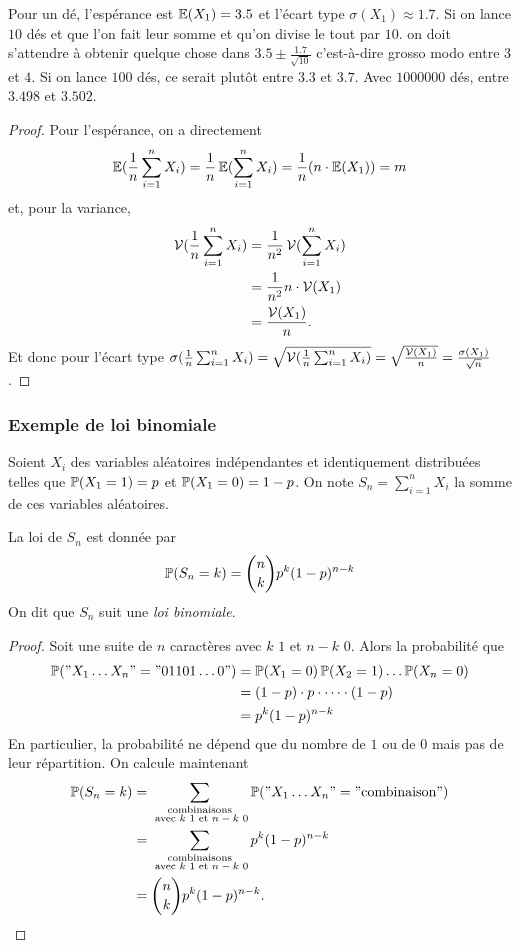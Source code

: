 \begin{ex}
Pour un dé, l'espérance est $\operatorname{\mathbb E}(X_1) = 3.5$ et l'écart type $\sigma(X_1)\approx 1.7$. Si on lance $10$ dés et que l'on fait leur somme et qu'on divise le tout par $10$. on doit s'attendre à obtenir quelque chose dans $3.5\pm\frac{1.7}{\sqrt{10}}$ c'est-à-dire grosso modo entre $3$ et $4$. Si on lance $100$ dés, ce serait plutôt entre $3.3$ et $3.7$. Avec $1000000$ dés, entre $3.498$ et $3.502$.
\end{ex}

\begin{proof}
Pour l'espérance, on a directement
$$\operatorname{\mathbb E}(\frac1n\sum_{i = 1}^nX_i) = \frac1n\operatorname{\mathbb E}(\sum_{i = 1}^nX_i) = \frac1n(n \cdot \operatorname{\mathbb E}(X_1)) = m$$
et, pour la variance,
\begin{align*}
\operatorname{\mathcal V}(\frac1n\sum_{i = 1}^nX_i) & = \frac1{n^2}\operatorname{\mathcal V}(\sum_{i = 1}^nX_i) \\
& = \frac1{n^2}n \cdot \operatorname{\mathcal V}(X_1) \\
& = \frac{\operatorname{\mathcal V}(X_1)}n.
\end{align*}
Et donc pour l'écart type $\sigma(\frac1n\sum_{i = 1}^nX_i) = \sqrt{\operatorname{\mathcal V}(\frac1n\sum_{i = 1}^nX_i)} = \sqrt{\frac{\operatorname{\mathcal V}(X_1)}n} = \frac{\sigma(X_1)}{\sqrt n}$.
\end{proof}


\subsubsection{Exemple de loi binomiale}


Soient $X_i$ des variables aléatoires indépendantes et identiquement distribuées telles que $\operatorname{\mathbb P}(X_1 = 1) = p$ et $\operatorname{\mathbb P}(X_1 = 0) = 1 - p$. On note $S_n = \sum_{i = 1}^nX_i$ la somme de ces variables aléatoires.


\begin{pro}
La loi de $S_n$ est donnée par
$$\operatorname{\mathbb P}(S_n = k) = \binom n k p^k(1 - p)^{n - k}$$
On dit que $S_n$ suit une \textit{loi binomiale}.
\end{pro}

\begin{proof}
Soit une suite de $n$ caractères avec $k$ $1$ et $n - k$ $0$. Alors la probabilité que
\begin{align*}
\operatorname{\mathbb P}("X_1\dots X_n" = "01101\dots0") & = \operatorname{\mathbb P}(X_1 = 0)\operatorname{\mathbb P}(X_2 = 1)\dots\operatorname{\mathbb P}(X_n = 0) \\
& = (1 - p) \cdot  p \cdot \dots \cdot (1 - p) \\
&  = p^k(1 - p)^{n - k}
\end{align*}
En particulier, la probabilité ne dépend que du nombre de $1$ ou de $0$ mais pas de leur répartition. On calcule maintenant
\begin{align*}
\operatorname{\mathbb P}(S_n = k) & = \sum_{\substack{\text{combinaisons} \\
\text{ avec $k$ $1$ et $n - k$ $0$}
}
}\operatorname{\mathbb P}("X_1\dots X_n" = "\text{combinaison}") \\
& = \sum_{\substack{\text{combinaisons} \\
\text{ avec $k$ $1$ et $n - k$ $0$}
}
}p^k(1 - p)^{n - k} \\
& = \binom n kp^k(1 - p)^{n - k}.
\end{align*}
\end{proof}


